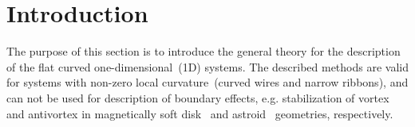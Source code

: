 \section*{Introduction}\label{sec:intro}



The purpose of this section is to introduce the general theory for the description of the flat curved one-dimensional~(1D) systems. The described methods are valid for systems with non-zero local curvature~(curved wires and narrow ribbons), and can not be used for description of boundary effects, e.g.  stabilization of vortex and antivortex in magnetically soft disk~\cite{Shinjo00} and astroid~\cite{Shigeto02} geometries, respectively.

